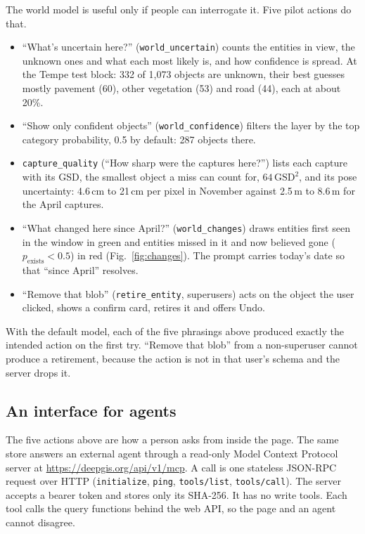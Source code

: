 \documentclass[journal]{IEEEtran}
\newcommand{\code}[1]{\texttt{#1}}
\begin{document}
The world model is useful only if people can interrogate it. Five pilot actions do that.
\begin{itemize}
\item ``What's uncertain here?'' (\code{world\_uncertain}) counts the entities in view, the unknown
ones and what each most likely is, and how confidence is spread. At the Tempe test block: 332 of
1{,}073 objects are unknown, their best guesses mostly pavement (60), other vegetation (53) and
road (44), each at about 20\%.
\item ``Show only confident objects'' (\code{world\_confidence}) filters the layer by the top
category probability, 0.5 by default: 287 objects there.
\item \code{capture\_quality} (``How sharp were the captures here?'') lists each capture with its
GSD, the smallest object a miss can count for, $64\,\mathrm{GSD}^2$, and its pose uncertainty:
4.6\,cm to 21\,cm per pixel in November against 2.5\,m to 8.6\,m for the April captures.
\item ``What changed here since April?'' (\code{world\_changes}) draws entities first seen in the
window in green and entities missed in it and now believed gone ($p_{\text{exists}} < 0.5$) in red
(Fig.~\ref{fig:changes}). The prompt carries today's date so that ``since April'' resolves.
\item ``Remove that blob'' (\code{retire\_entity}, superusers) acts on the object the user clicked,
shows a confirm card, retires it and offers Undo.
\end{itemize}
With the default model, each of the five phrasings above produced exactly the intended action on
the first try. ``Remove that blob'' from a non-superuser cannot produce a retirement, because the
action is not in that user's schema and the server drops it.

\subsection{An interface for agents}
\label{sec:mcp}

The five actions above are how a person asks from inside the page. The same store answers an
external agent through a read-only Model Context Protocol server at
\url{https://deepgis.org/api/v1/mcp}. A call is one stateless JSON-RPC request over HTTP
(\code{initialize}, \code{ping}, \code{tools/list}, \code{tools/call}). The server accepts a
bearer token and stores only its SHA-256. It has no write tools. Each tool calls the query
functions behind the web API, so the page and an agent cannot disagree.
\end{document}
